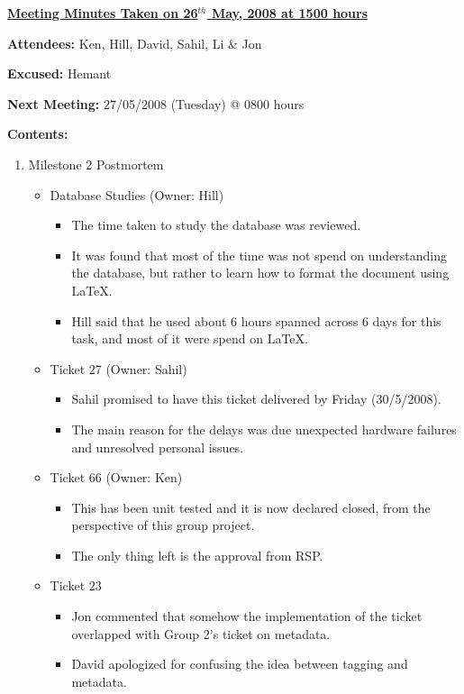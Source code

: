 \documentclass{letter}
\begin{document}
{\large \textbf{\underline{Meeting Minutes Taken on 26$^{th}$ May, 2008 at 1500 hours}}}

\textbf{Attendees:} Ken, Hill, David, Sahil, Li \& Jon 

\textbf{Excused:} Hemant

\textbf{Next Meeting:} 27/05/2008 (Tuesday) @ 0800 hours 

\textbf{Contents:}

\begin{enumerate}
\item Milestone 2 Postmortem
	\begin{itemize}
		\item Database Studies (Owner: Hill)
			\begin{itemize}
				\item The time taken to study the database was reviewed.
				\item It was found that most of the time was not spend on understanding the database, but rather to learn how to format the document using LaTeX. 
				\item Hill said that he used about 6 hours spanned across 6 days for this task, and most of it were spend on LaTeX. 
			\end{itemize}
		\item Ticket 27 (Owner: Sahil)
			\begin{itemize}
				\item Sahil promised to have this ticket delivered by Friday (30/5/2008).
				   \item The main reason for the delays was due unexpected hardware failures and unresolved personal issues. 
			  \end{itemize}
		 \item Ticket 66 (Owner: Ken)
		 	  \begin{itemize}
			  		\item This has been unit tested and it is now declared closed, from the perspective of this group project. 
					\item The only thing left is the approval from RSP.
			  \end{itemize}
		 \item Ticket 23
		 	  \begin{itemize}
			  	    \item Jon commented that somehow the implementation of the ticket overlapped with Group 2's ticket on metadata. 
				    \item David apologized for confusing the idea between tagging and metadata. 

\end{itemize}
\end{itemize}
\end{enumerate}
\end{document}
